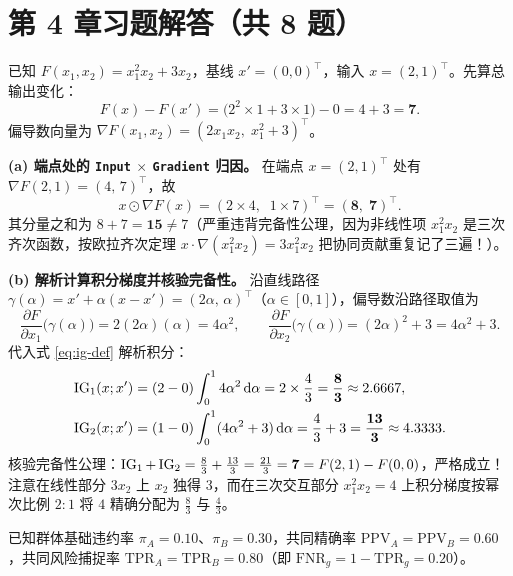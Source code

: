 \section*{第 4 章习题解答（共 8 题）}


已知 $F(x_1, x_2) = x_1^2 x_2 + 3x_2$，基线 $x' = (0, 0)^\top$，输入 $x = (2, 1)^\top$。先算总输出变化：
\[
  F(x) - F(x') = \big(2^2 \times 1 + 3 \times 1\big) - 0 = 4 + 3 = \mathbf{7}.
\]
偏导数向量为 $\nabla F(x_1, x_2) = (2 x_1 x_2,\; x_1^2 + 3)^\top$。

\textbf{(a) 端点处的 \texttt{Input} $\times$ \texttt{Gradient} 归因。}
在端点 $x = (2, 1)^\top$ 处有 $\nabla F(2, 1) = (4,\, 7)^\top$，故
\[
  x \odot \nabla F(x) = (2 \times 4,\;\; 1 \times 7)^\top = \mathbf{(8,\; 7)^\top}.
\]
其分量之和为 $8 + 7 = \mathbf{15} \neq 7$（严重违背完备性公理，因为非线性项 $x_1^2 x_2$ 是三次齐次函数，按欧拉齐次定理 $x \cdot \nabla(x_1^2 x_2) = 3 x_1^2 x_2$ 把协同贡献重复记了三遍！）。

\textbf{(b) 解析计算积分梯度并核验完备性。}
沿直线路径 $\gamma(\alpha) = x' + \alpha(x - x') = (2\alpha,\, \alpha)^\top$（$\alpha \in [0, 1]$），偏导数沿路径取值为
\[
  \frac{\partial F}{\partial x_1}\big(\gamma(\alpha)\big) = 2(2\alpha)(\alpha) = 4\alpha^2, \qquad
  \frac{\partial F}{\partial x_2}\big(\gamma(\alpha)\big) = (2\alpha)^2 + 3 = 4\alpha^2 + 3.
\]
代入式 \eqref{eq:ig-def} 解析积分：
\begin{align*}
  \operatorname{IG}_1(x; x') &= (2 - 0)\int_0^1 4\alpha^2\,\mathrm{d}\alpha
                = 2 \times \frac{4}{3} = \mathbf{\frac{8}{3}} \approx 2.6667, \\
  \operatorname{IG}_2(x; x') &= (1 - 0)\int_0^1 (4\alpha^2 + 3)\,\mathrm{d}\alpha
                = \frac{4}{3} + 3 = \mathbf{\frac{13}{3}} \approx 4.3333.
\end{align*}
核验完备性公理：$\operatorname{IG}_1 + \operatorname{IG}_2 = \frac{8}{3} + \frac{13}{3} = \frac{21}{3} = \mathbf{7} = F(2,1) - F(0,0)$，严格成立！注意在线性部分 $3x_2$ 上 $x_2$ 独得 $3$，而在三次交互部分 $x_1^2 x_2 = 4$ 上积分梯度按幂次比例 $2:1$ 将 $4$ 精确分配为 $\frac{8}{3}$ 与 $\frac{4}{3}$。


已知群体基础违约率 $\pi_A = 0.10$、$\pi_B = 0.30$，共同精确率 $\mathrm{PPV}_A = \mathrm{PPV}_B = 0.60$，共同风险捕捉率 $\mathrm{TPR}_A = \mathrm{TPR}_B = 0.80$（即 $\mathrm{FNR}_g = 1 - \mathrm{TPR}_g = 0.20$）。

